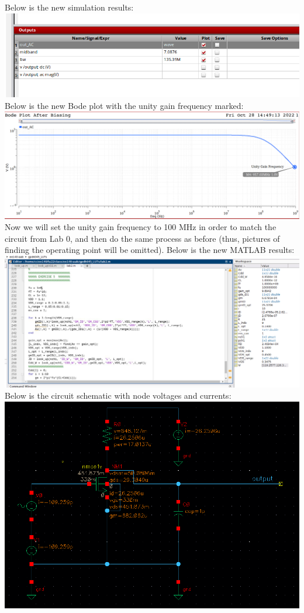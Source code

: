 \documentclass[12pt, fleqn]{article}
\begin{document}
Below is the new simulation results:\\[0.25cm]
\includegraphics[scale=0.375, center]{sim_res8.PNG}\\[0.25cm]
\newpage
Below is the new Bode plot with the unity gain frequency marked:\\[0.25cm]
\includegraphics[scale=0.275, center]{bode8.PNG}\\[0.25cm]
Now we will set the unity gain frequency to 100 MHz in order to match the circuit from Lab 0, and then do the same process as before (thus, pictures of finding the operating point will be omitted).  Below is the new MATLAB results:\\[0.25cm]
\includegraphics[scale=0.375, center]{mat_res10.PNG}\\[0.25cm]
\newpage
Below is the circuit schematic with node voltages and currents:\\[0.25cm]
\includegraphics[scale=0.375, center]{schem8.PNG}\\[0.25cm]
\end{document}
